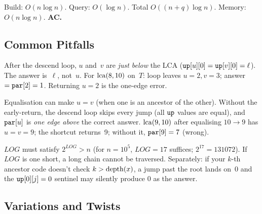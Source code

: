 \begin{complexitybox}
Build: \(O(n\log n)\).  Query: \(O(\log n)\).  Total \(O((n+q)\log n)\).
Memory: \(O(n\log n)\).  \textbf{AC.}
\end{complexitybox}

\subsection{Common Pitfalls}

\begin{warningbox}
After the descend loop, \(u\) and~\(v\) are \emph{just below} the LCA
(\(\texttt{up}[u][0] = \texttt{up}[v][0] = \ell\)).  The answer is~\(\ell\),
not~\(u\).  For \(\operatorname{lca}(8,10)\) on~\(T\): loop leaves \(u=2, v=3\); answer
\(= \texttt{par}[2] = 1\).  Returning \(u=2\) is the one-edge error.
\end{warningbox}

\begin{warningbox}[Trap 2: Dropping the \(u = v\) shortcut]
Equalisation can make \(u = v\) (when one is an ancestor of the other).
Without the early-return, the descend loop skips every jump (all
\(\texttt{up}\) values are equal), and \(\texttt{par}[u]\) is \emph{one edge above} the correct
answer.  \(\operatorname{lca}(9,10)\) after equalising \(10\to9\) has \(u=v=9\); the
shortcut returns~9; without it, \(\texttt{par}[9]=7\) (wrong).
\end{warningbox}

\begin{warningbox}
\(\mathit{LOG}\) must satisfy \(2^{\mathit{LOG}} > n\) (for \(n=10^5\), \(\mathit{LOG}=17\) suffices;
\(2^{17}=131072\)).  If \(\mathit{LOG}\) is one short, a long chain cannot be
traversed.  Separately: if your \(k\)-th ancestor code doesn't check
\(k > \operatorname{depth}(x)\), a jump past the root lands on~0 and the
\(\texttt{up}[0][j] = 0\) sentinel may silently produce 0 as the answer.
\end{warningbox}

\subsection{Variations and Twists}

